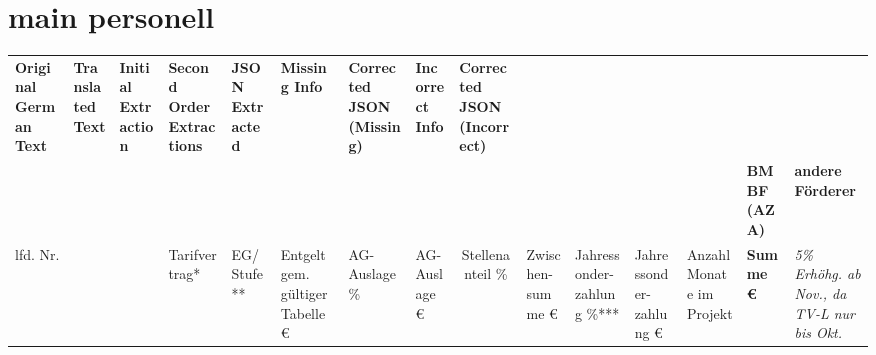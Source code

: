 \section{main personell}
\begin{table}[]
\begin{tabular}{clllcrrrrrrrrrr}
\multicolumn{1}{l}{\textbf{Original German Text}}                                       & \textbf{Translated Text}                                & \textbf{Initial Extraction} & \textbf{Second Order Extractions} & \multicolumn{1}{l}{\textbf{JSON Extracted}}  & \multicolumn{1}{l}{\textbf{Missing Info}}           & \multicolumn{1}{l}{\textbf{Corrected JSON (Missing)}} & \multicolumn{1}{l}{\textbf{Incorrect Info}}  & \multicolumn{1}{l}{\textbf{Corrected JSON (Incorrect)}} & \multicolumn{1}{l}{}                         & \multicolumn{1}{l}{}                           & \multicolumn{1}{l}{}                         & \multicolumn{1}{l}{}                         & \multicolumn{1}{l}{}                                            & \multicolumn{1}{l}{}                                                                          \\
\rowcolor[HTML]{C6D9F1} 
\multicolumn{1}{l}{\cellcolor[HTML]{C6D9F1}\textbf{2027}}                               &                                                         &                             &                                   & \multicolumn{1}{l}{\cellcolor[HTML]{C6D9F1}} & \multicolumn{1}{l}{\cellcolor[HTML]{C6D9F1}}        & \multicolumn{1}{l}{\cellcolor[HTML]{C6D9F1}}          & \multicolumn{1}{l}{\cellcolor[HTML]{C6D9F1}} & \multicolumn{1}{l}{\cellcolor[HTML]{C6D9F1}}            & \multicolumn{1}{l}{\cellcolor[HTML]{C6D9F1}} & \multicolumn{1}{l}{\cellcolor[HTML]{C6D9F1}}   & \multicolumn{1}{l}{\cellcolor[HTML]{C6D9F1}} & \multicolumn{1}{l}{\cellcolor[HTML]{C6D9F1}} & \multicolumn{1}{l}{\cellcolor[HTML]{92D050}\textbf{BMBF (AZA)}} & \multicolumn{1}{l}{\cellcolor[HTML]{92D050}\textbf{andere Förderer}}                          \\
\multicolumn{1}{l}{lfd. Nr.}                                                            &                                                         &                             & Tarifvertrag*                     & \multicolumn{1}{l}{EG/ Stufe**}              & \multicolumn{1}{l}{Entgelt gem. gültiger Tabelle €} & \multicolumn{1}{l}{AG-Auslage \%}                     & \multicolumn{1}{l}{AG-Auslage €}             & \multicolumn{1}{c}{Stellenanteil \%}                    & \multicolumn{1}{l}{Zwischen-summe €}         & \multicolumn{1}{l}{Jahressonder-zahlung \%***} & \multicolumn{1}{l}{Jahressonder-zahlung €}   & \multicolumn{1}{l}{Anzahl Monate im Projekt} & \multicolumn{1}{l}{\textbf{Summe €}}                            & \multicolumn{1}{l}{{\color[HTML]{FF0000} \textit{5\% Erhöhg. ab Nov., da TV-L nur bis Okt.}}} \\

\end{tabular}
\end{table}
